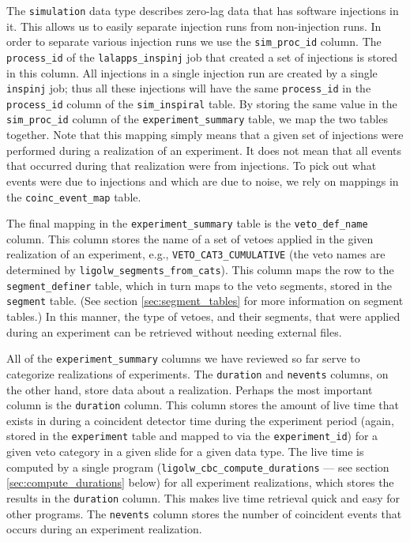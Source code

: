 The \texttt{simulation} data type describes zero-lag data that has software injections in it. This allows us to easily separate injection runs from non-injection runs. In order to separate various injection runs we use the \texttt{sim\_proc\_id} column. The \texttt{process\_id} of the \texttt{lalapps\_inspinj} job that created a set of injections is stored in this column. All injections in a single injection run are created by a single \texttt{inspinj} job; thus all these injections will have the same \texttt{process\_id} in the \texttt{process\_id} column of the \texttt{sim\_inspiral} table. By storing the same value in the \texttt{sim\_proc\_id} column of the \texttt{experiment\_summary} table, we map the two tables together. Note that this mapping simply means that a given set of injections were performed during a realization of an experiment. It does not mean that all events that occurred during that realization were from injections. To pick out what events were due to injections and which are due to noise, we rely on mappings in the \texttt{coinc\_event\_map} table.

The final mapping in the \texttt{experiment\_summary} table is the
\texttt{veto\_def\_name} column. This column stores the name of a set of vetoes
applied in the given realization of an experiment, e.g.,
\texttt{VETO\_CAT3\_CUMULATIVE} (the veto names are determined by
\texttt{ligolw\_segments\_from\_cats}). This column maps the row to the
\texttt{segment\_definer} table, which in turn maps to the veto segments,
stored in the \texttt{segment} table. (See section \ref{sec:segment_tables} for
more information on segment tables.) In this manner, the type of vetoes, and
their segments, that were applied during an experiment can be retrieved without
needing external files.

All of the \texttt{experiment\_summary} columns we have reviewed so far serve
to categorize realizations of experiments. The \texttt{duration} and
\texttt{nevents} columns, on the other hand, store data about a realization.
Perhaps the most important column is the \texttt{duration} column. This column
stores the amount of live time that exists in during a coincident detector time
during the experiment period (again, stored in the \texttt{experiment} table
and mapped to via the \texttt{experiment\_id}) for a given veto category in a
given slide for a given data type. The live time is computed by a single
program (\texttt{ligolw\_cbc\_compute\_durations} --- see section
\ref{sec:compute_durations} below) for all experiment realizations, which
stores the results in the \texttt{duration} column. This makes live time
retrieval quick and easy for other programs. The \texttt{nevents} column stores
the number of coincident events that occurs during an experiment realization.

